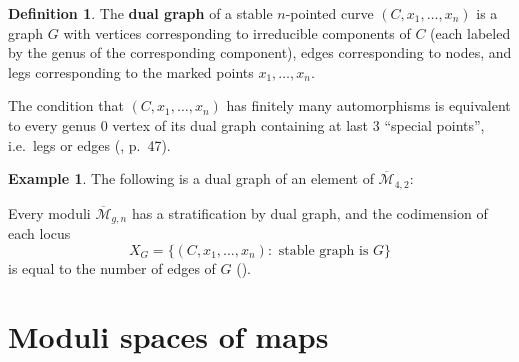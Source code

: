 \documentclass[thesis]{thesis-umich}           %
\theoremstyle{definition}
\newtheorem{dfn}[thm]{Definition}
\newtheorem{eg}[thm]{Example}
\begin{document}
\begin{dfn}
  The {\bf dual graph} of a stable $n$-pointed curve $(C,x_1,\dots,x_n)$
  is a graph $G$ with vertices corresponding to irreducible components
  of $C$ (each labeled by the genus of
  the corresponding component), edges corresponding to nodes, and
  legs corresponding to the marked points $x_1,\dots,x_n$.
\end{dfn}

The condition that $(C,x_1,\dots,x_n)$ has finitely many
automorphisms is equivalent to every genus $0$ vertex of its dual graph
containing at last 3 ``special points'', i.e.\ legs or edges (\cite{Moduli}, p.\ 47).

\begin{eg}
  The following is a dual graph of an element of $\overline{\mathcal M}_{4,2}$:


    Every moduli $\overline{\mathcal M}_{g,n}$ has a stratification
    by dual graph, and the codimension of each locus
    \[
    X_G=\{(C,x_1,\dots,x_n):\text{ stable graph is }G\}
    \]
    is equal to the number of edges of $G$ (\cite{Vakil}).
  
  \end{eg}


\section{Moduli spaces of maps}
\end{document}
